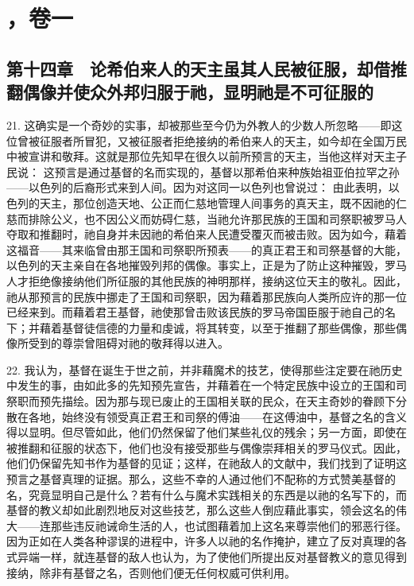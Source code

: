 

\section{，卷一}


\subsection{第十四章　论希伯来人的天主虽其人民被征服，却借推翻偶像并使众外邦归服于祂，显明祂是不可征服的}

21. 这确实是一个奇妙的实事，却被那些至今仍为外教人的少数人所忽略——即这位曾被征服者所冒犯，又被征服者拒绝接纳的希伯来人的天主，如今却在全国万民中被宣讲和敬拜。这就是那位先知早在很久以前所预言的天主，当他这样对天主子民说： 这预言是通过基督的名而实现的，基督以那希伯来种族始祖亚伯拉罕之孙——以色列的后裔形式来到人间。因为对这同一以色列也曾说过： 由此表明，以色列的天主，那位创造天地、公正而仁慈地管理人间事务的真天主，既不因祂的仁慈而排除公义，也不因公义而妨碍仁慈，当祂允许那民族的王国和司祭职被罗马人夺取和推翻时，祂自身并未因祂的希伯来人民遭受覆灭而被击败。因为如今，藉着这福音——其来临曾由那王国和司祭职所预表——的真正君王和司祭基督的大能，以色列的天主亲自在各地摧毁列邦的偶像。事实上，正是为了防止这种摧毁，罗马人才拒绝像接纳他们所征服的其他民族的神明那样，接纳这位天主的敬礼。因此，祂从那预言的民族中挪走了王国和司祭职，因为藉着那民族向人类所应许的那一位已经来到。而藉着君王基督，祂使那曾击败该民族的罗马帝国臣服于祂自己的名下；并藉着基督徒信德的力量和虔诚，将其转变，以至于推翻了那些偶像，那些偶像所受到的尊崇曾阻碍对祂的敬拜得以进入。\par

22. 我认为，基督在诞生于世之前，并非藉魔术的技艺，使得那些注定要在祂历史中发生的事，由如此多的先知预先宣告，并藉着在一个特定民族中设立的王国和司祭职而预先描绘。因为那与现已废止的王国相关联的民众，在天主奇妙的眷顾下分散在各地，始终没有领受真正君王和司祭的傅油——在这傅油中，基督之名的含义得以显明。但尽管如此，他们仍然保留了他们某些礼仪的残余；另一方面，即使在被推翻和征服的状态下，他们也没有接受那些与偶像崇拜相关的罗马仪式。因此，他们仍保留先知书作为基督的见证；这样，在祂敌人的文献中，我们找到了证明这预言之基督真理的证据。那么，这些不幸的人通过他们不配称的方式赞美基督的名，究竟显明自己是什么？若有什么与魔术实践相关的东西是以祂的名写下的，而基督的教义却如此剧烈地反对这些技艺，那么这些人倒应藉此事实，领会这名的伟大——连那些违反祂诫命生活的人，也试图藉着加上这名来尊崇他们的邪恶行径。因为正如在人类各种谬误的进程中，许多人以祂的名作掩护，建立了反对真理的各式异端一样，就连基督的敌人也认为，为了使他们所提出反对基督教义的意见得到接纳，除非有基督之名，否则他们便无任何权威可供利用。\par

